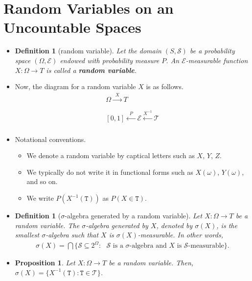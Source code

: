\documentclass[10pt]{article}
\newtheorem{definition}[lemma]{Definition}
\newtheorem{proposition}[lemma]{Proposition}
\numberwithin{lemma}{section}
\newcommand{\mcal}[1]{\mathcal{#1}}
\begin{document}
\section{Random Variables on an Uncountable Spaces}
\begin{itemize}
  \item \begin{definition}[random variable]
    Let the domain $(S,\mcal{S})$ be a probability space $(\Omega, \mcal{E})$ endowed with probability measure $P$. An $\mcal{E}$-measurable function $X: \Omega \rightarrow T$ is called a {\bf random variable}. 
  \end{definition}

  \item Now, the diagram for a random variable $X$ is as follows.
  \begin{align*}
    \Omega \xrightarrow[\phantom{X^{-1}}]{X} T \\
    [0,1] \xleftarrow[\phantom{X^{-1}}]{P} \mcal{E} \xleftarrow[]{X^{-1}} \mcal{T}
  \end{align*}
  
  \item Notational conventions.
  \begin{itemize}
    \item We denote a random variable by captical letters such as $X$, $Y$, $Z$. 
    \item We typically do not write it in functional forms such as $X(\omega)$, $Y(\omega)$, and so on. 
    \item We write $P(X^{-1}(\mathtt{T}))$ as $P(X \in \mathtt{T})$.
  \end{itemize}

  \item \begin{definition}[$\sigma$-algebra generated by a random variable] \label{def:sigma-algebra-rand-var}
    Let $X: \Omega \rightarrow T$ be a random variable. The $\sigma$-algebra generated by $X$, denoted by $\sigma(X)$, is the smallest $\sigma$-algebra such that $X$ is $\sigma(X)$-measurable. In other words,
    \begin{align*}
      \sigma(X) = \bigcap \Big\{ \mcal{S} \subseteq 2^\Omega : \mbox{ $\mcal{S}$ is a $\sigma$-algebra and $X$ is $\mcal{S}$-measurable}  \Big\}.
    \end{align*}
  \end{definition}

  \item \begin{proposition}
    Let $X: \Omega \rightarrow T$ be a random variable. Then, $\sigma(X) = \{ X^{-1}(\mathtt{T}) : \mathtt{T} \in \mcal{T} \}$.
  \end{proposition}


\end{itemize}
\end{document}
